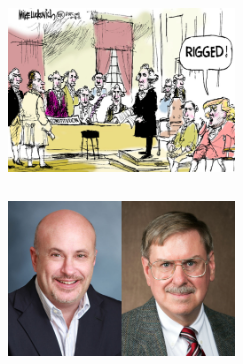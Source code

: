 \documentclass[twoside]{article}
\begin{document}
\begin{titlepage}
      \centering
      \vskip2cm
      \centering
      \begin{figure}[H]
        \centering
        \begin{subfigure}{.4\textwidth}
          \centering
          \includegraphics[width=6cm,height=4.5cm,keepaspectratio]{images/frontpage/Rigged.jpg}
          \end{subfigure}%
          \begin{subfigure}{.4\textwidth}
            \centering
            \includegraphics[width=6cm,height=4.5cm,keepaspectratio]{images/frontpage/House.jpg}
            \end{subfigure}%
          \end{figure}
        \end{titlepage}
        \tableofcontents
        \newpage
\end{document}
